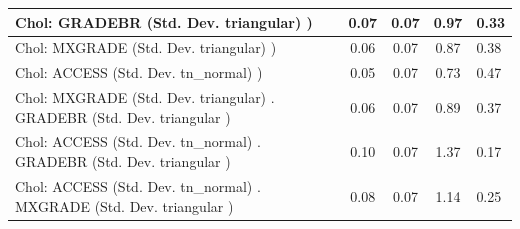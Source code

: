 \begin{table}
\begin{center}
\begin{tabular}{|l|l|c|c|c|l|}
			\hline
			 Chol: GRADEBR (Std. Dev. triangular) ) &  & 0.07 & 0.07 & 0.97 & 0.33 \\
			\hline
			 Chol: MXGRADE (Std. Dev. triangular) ) &  & 0.06 & 0.07 & 0.87 & 0.38 \\
			\hline
			 Chol: ACCESS (Std. Dev. tn_normal) ) &  & 0.05 & 0.07 & 0.73 & 0.47 \\
			\hline
			 Chol: MXGRADE (Std. Dev. triangular) . GRADEBR (Std. Dev.   triangular ) &  & 0.06 & 0.07 & 0.89 & 0.37 \\
			\hline
			 Chol: ACCESS (Std. Dev. tn_normal) . GRADEBR (Std. Dev.   triangular ) &  & 0.10 & 0.07 & 1.37 & 0.17 \\
			\hline
			 Chol: ACCESS (Std. Dev. tn_normal) . MXGRADE (Std. Dev.   triangular ) &  & 0.08 & 0.07 & 1.14 & 0.25 \\
			\hline
		\end{tabular}
	\end{center}
\end{table}
